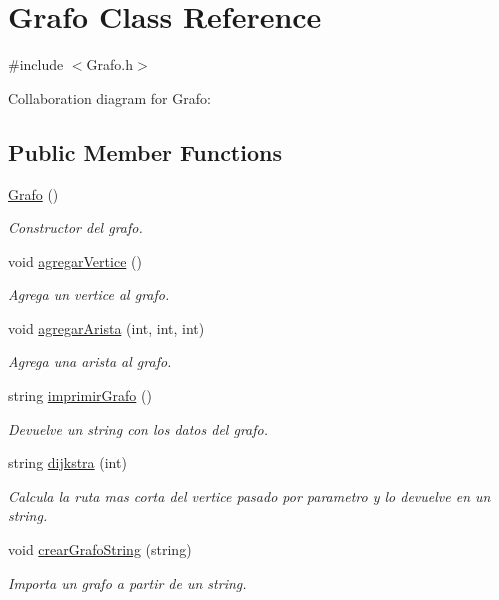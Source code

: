 \hypertarget{classGrafo}{}\section{Grafo Class Reference}
\label{classGrafo}


{\ttfamily \#include $<$Grafo.\+h$>$}



Collaboration diagram for Grafo\+:
\subsection*{Public Member Functions}
\begin{DoxyCompactItemize}
\item 
\hyperlink{classGrafo_ab810bbe26a98e9af6661ccddff66b03b}{Grafo} ()
\begin{DoxyCompactList}\small\item\em Constructor del grafo. \end{DoxyCompactList}\item 
void \hyperlink{classGrafo_a7c8cab214abde4ddf2805e43aef72ef3}{agregar\+Vertice} ()
\begin{DoxyCompactList}\small\item\em Agrega un vertice al grafo. \end{DoxyCompactList}\item 
void \hyperlink{classGrafo_a6265e95aef23ebedcbfd69d5b39cb9ea}{agregar\+Arista} (int, int, int)
\begin{DoxyCompactList}\small\item\em Agrega una arista al grafo. \end{DoxyCompactList}\item 
string \hyperlink{classGrafo_a393cda605e6668dd60b8263fbed5a979}{imprimir\+Grafo} ()
\begin{DoxyCompactList}\small\item\em Devuelve un string con los datos del grafo. \end{DoxyCompactList}\item 
string \hyperlink{classGrafo_ad18bb16f84b89aea265793342de538a9}{dijkstra} (int)
\begin{DoxyCompactList}\small\item\em Calcula la ruta mas corta del vertice pasado por parametro y lo devuelve en un string. \end{DoxyCompactList}\item 
void \hyperlink{classGrafo_a7338b379e79f768ce524d022157ae8e7}{crear\+Grafo\+String} (string)
\begin{DoxyCompactList}\small\item\em Importa un grafo a partir de un string. \end{DoxyCompactList}\end{DoxyCompactItemize}
